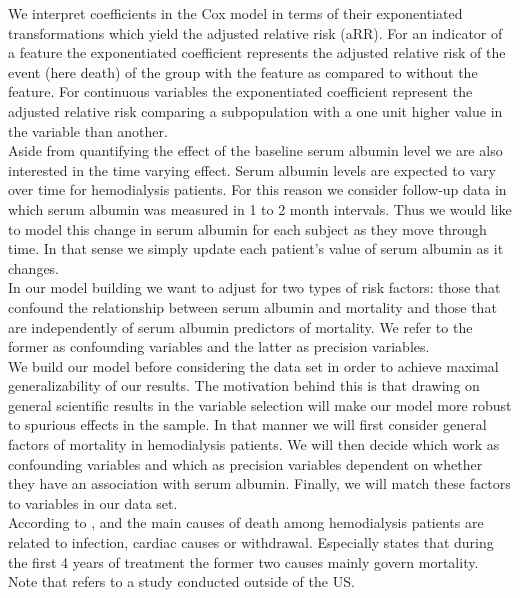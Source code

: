 \documentclass[paper=a4, fontsize=11pt]{scrartcl} %
\numberwithin{equation}{section} %
\numberwithin{figure}{section} %
\numberwithin{table}{section} %
\begin{document}
We interpret coefficients in the Cox model in terms of their exponentiated transformations which yield the adjusted relative risk (aRR). For an indicator of a feature the exponentiated coefficient represents the adjusted relative risk of the event (here death) of the group with the feature as compared to without the feature. For continuous variables the exponentiated coefficient represent the adjusted relative risk comparing a subpopulation with a one unit higher value in the variable than another.\\

Aside from quantifying the effect of the baseline serum albumin level we are also interested in the time varying effect. Serum albumin levels are expected to vary over time for hemodialysis patients. For this reason we consider follow-up data in which serum albumin was measured in 1 to 2 month intervals. Thus we would like to model this change in serum albumin for each subject as they move through time. In that sense we simply update each patient's value of serum albumin as it changes.\\ %

In our model building we want to adjust for two types of risk factors: those that confound the relationship between serum albumin and mortality and those that are independently of serum albumin predictors of mortality. We refer to the former as confounding variables and the latter as precision variables.\\

We build our model before considering the data set in order to achieve maximal generalizability of our results. The motivation behind this is that drawing on general scientific results in the variable selection will make our model more robust to spurious effects in the sample. In that manner we will first consider general factors of mortality in hemodialysis patients. We will then decide which work as confounding variables and which as precision variables dependent on whether they have an association with serum albumin. Finally, we will match these factors to variables in our data set.\\

According to \cite{elsharif}, \cite{mailloux} and \cite{sukhuja} the main causes of death among hemodialysis patients are related to infection, cardiac causes or withdrawal. Especially \cite{mailloux} states that during the first 4 years of treatment the former two causes mainly govern mortality. Note that \cite{elsharif} refers to a study conducted outside of the US.\\
\end{document}
